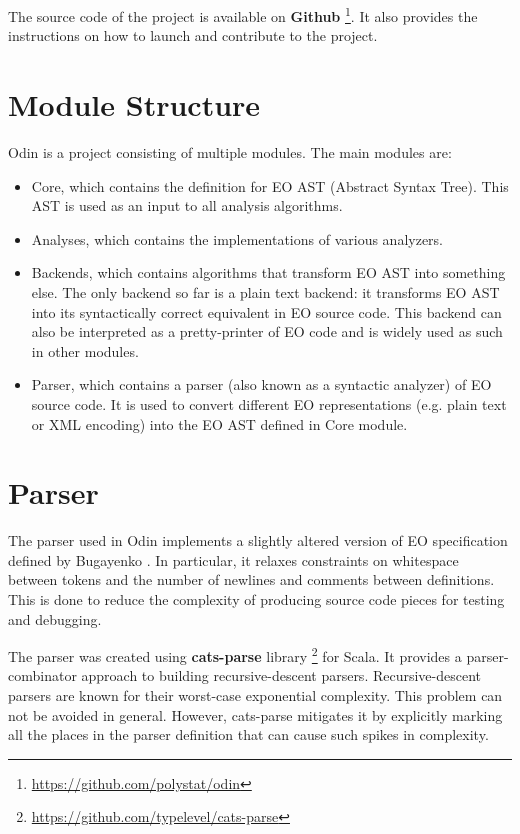 The source code of the project is available on \textbf{Github} \footnote{\url{https://github.com/polystat/odin}}. It also provides the instructions on how to launch and contribute to the project.



\section{Module Structure}
Odin is a project consisting of multiple modules. The main modules are:
\begin{itemize}
    \item Core, which contains the definition for EO AST (Abstract Syntax Tree).
          This AST is used as an input to all analysis algorithms.
    \item Analyses, which contains the implementations of various analyzers.
    \item Backends, which contains algorithms that transform EO AST into something else. The only backend so far is a plain text backend: it transforms EO AST into its syntactically correct equivalent in EO source code. This backend can also be interpreted as a pretty-printer of EO code and is widely used as such in other modules.
    \item Parser, which contains a parser (also known as a syntactic analyzer) of EO source code. It is used to convert different EO representations (e.g. plain text or XML encoding) into the EO AST defined in Core module.
\end{itemize}
\section{Parser}
The parser used in Odin implements a slightly altered version of EO specification defined by Bugayenko \cite{eolang}. In particular, it relaxes constraints on whitespace between tokens and the number of newlines and comments between definitions. This is done to reduce the complexity of producing source code pieces for testing and debugging.


The parser was created using \textbf{cats-parse} library \footnote{\url{https://github.com/typelevel/cats-parse}} for Scala. It provides a parser-combinator \cite{hill_combinators_1996} approach to building recursive-descent parsers. Recursive-descent parsers are known for their worst-case exponential complexity. This problem can not be avoided in general. However, cats-parse mitigates it by explicitly marking all the places in the parser definition that can cause such spikes in complexity.

